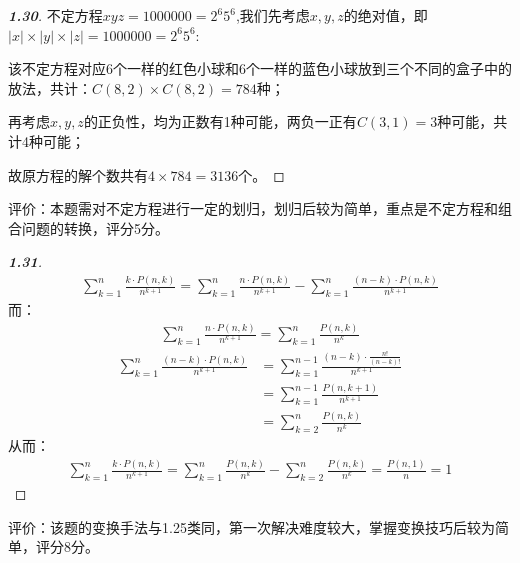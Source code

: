 \documentclass[12pt]{article}
\begin{document}
\begin{proof}[\textbf{1.30}]
    不定方程$xyz = 1000000 = 2^6 5^6$,我们先考虑$x,y,z$的绝对值，即$|x| \times |y| \times |z| = 1000000 = 2^6 5^6$:

    该不定方程对应6个一样的红色小球和6个一样的蓝色小球放到三个不同的盒子中的放法，共计：$C(8,2) \times C(8,2) = 784$种；

    再考虑$x,y,z$的正负性，均为正数有1种可能，两负一正有$C(3,1) = 3$种可能，共计4种可能；

    故原方程的解个数共有$4 \times 784 = 3136$个。
\end{proof}
评价：本题需对不定方程进行一定的划归，划归后较为简单，重点是不定方程和组合问题的转换，评分5分。

\begin{proof}[\textbf{1.31}]
    \begin{align*}
        \sum_{k = 1}^n \frac{k\cdot P(n,k)}{n^{k+1}} = \sum_{k = 1}^n \frac{n\cdot P(n,k)}{n^{k+1}} - \sum_{k = 1}^n \frac{(n-k)\cdot P(n,k)}{n^{k+1}}
    \end{align*}
    而：
    \begin{align*}
        \sum_{k = 1}^n \frac{n\cdot P(n,k)}{n^{k+1}} = \sum_{k = 1}^n \frac{P(n,k)}{n^{k}}
    \end{align*}
    \begin{align*}
        \sum_{k = 1}^n \frac{(n-k)\cdot P(n,k)}{n^{k+1}} 
        &= \sum_{k = 1}^{n-1} \frac{(n-k)\cdot \frac{n!}{(n-k)!}}{n^{k+1}} \\
        &= \sum_{k = 1}^{n-1} \frac{P(n,k+1)}{n^{k+1}} \\
        &= \sum_{k = 2}^{n} \frac{P(n,k)}{n^{k}} 
    \end{align*}
    从而：
    \begin{align*}
        \sum_{k = 1}^n \frac{k\cdot P(n,k)}{n^{k+1}} = \sum_{k = 1}^n \frac{P(n,k)}{n^{k}} -  \sum_{k = 2}^{n} \frac{P(n,k)}{n^{k}} = \frac{P(n,1)}{n} = 1
    \end{align*}
\end{proof}
评价：该题的变换手法与1.25类同，第一次解决难度较大，掌握变换技巧后较为简单，评分8分。
\end{document}
